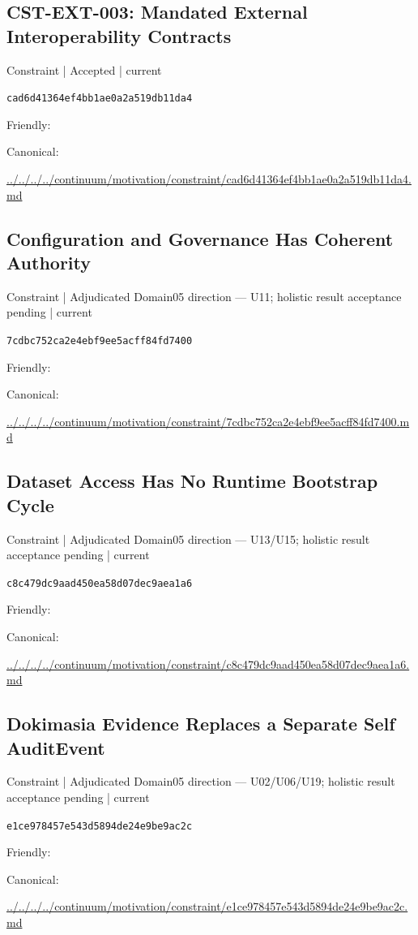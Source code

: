 \documentclass[10pt,a4paper]{article}
\begin{document}
\subsection*{CST-EXT-003: Mandated External Interoperability Contracts}
{\small Constraint | Accepted | current}\par
\texttt{cad6d41364ef4bb1ae0a2a519db11da4}\par
Friendly: \par
Canonical: \par
{\footnotesize\url{../../../../continuum/motivation/constraint/cad6d41364ef4bb1ae0a2a519db11da4.md}}\par
\subsection*{Configuration and Governance Has Coherent Authority}
{\small Constraint | Adjudicated Domain05 direction — U11; holistic result acceptance pending | current}\par
\texttt{7cdbc752ca2e4ebf9ee5acff84fd7400}\par
Friendly: \par
Canonical: \par
{\footnotesize\url{../../../../continuum/motivation/constraint/7cdbc752ca2e4ebf9ee5acff84fd7400.md}}\par
\subsection*{Dataset Access Has No Runtime Bootstrap Cycle}
{\small Constraint | Adjudicated Domain05 direction — U13/U15; holistic result acceptance pending | current}\par
\texttt{c8c479dc9aad450ea58d07dec9aea1a6}\par
Friendly: \par
Canonical: \par
{\footnotesize\url{../../../../continuum/motivation/constraint/c8c479dc9aad450ea58d07dec9aea1a6.md}}\par
\subsection*{Dokimasia Evidence Replaces a Separate Self AuditEvent}
{\small Constraint | Adjudicated Domain05 direction — U02/U06/U19; holistic result acceptance pending | current}\par
\texttt{e1ce978457e543d5894de24e9be9ac2c}\par
Friendly: \par
Canonical: \par
{\footnotesize\url{../../../../continuum/motivation/constraint/e1ce978457e543d5894de24e9be9ac2c.md}}\par
\end{document}
